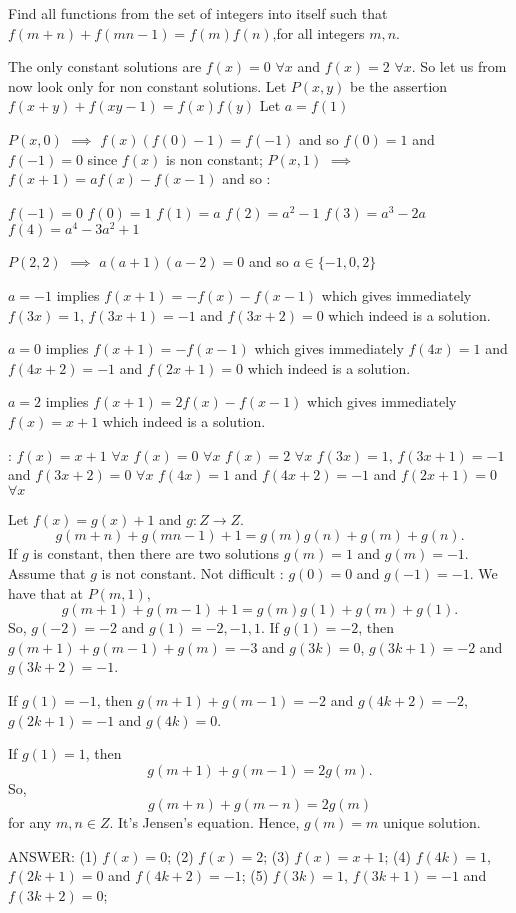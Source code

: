 \begin{solution}
	\begin{tcolorbox}Find all functions from the set of integers into itself such that $ f(m+n)+f(mn-1)=f(m)f(n) $,for all integers $m,n$.\end{tcolorbox}
The only constant solutions are $f(x)=0$ $\forall x$ and $f(x)=2$ $\forall x$.
So let us from now look only for non constant solutions.
Let $P(x,y)$ be the assertion $f(x+y)+f(xy-1)=f(x)f(y)$
Let $a=f(1)$

$P(x,0)$ $\implies$ $f(x)(f(0)-1)=f(-1)$ and so $f(0)=1$ and $f(-1)=0$ since $f(x)$ is non constant;
$P(x,1)$ $\implies$ $f(x+1)=af(x)-f(x-1)$ and so :

$f(-1)=0$
$f(0)=1$
$f(1)=a$
$f(2)=a^2-1$
$f(3)=a^3-2a$
$f(4)=a^4-3a^2+1$

$P(2,2)$ $\implies$ $a(a+1)(a-2)=0$ and so $a\in\{-1,0,2\}$

$a=-1$ implies $f(x+1)=-f(x)-f(x-1)$ which gives immediately $f(3x)=1$, $f(3x+1)=-1$ and $f(3x+2)=0$ which indeed is a solution.

$a=0$ implies $f(x+1)=-f(x-1)$ which gives immediately $f(4x)=1$ and $f(4x+2)=-1$ and $f(2x+1)=0$ which indeed is a solution.

$a=2$ implies $f(x+1)=2f(x)-f(x-1)$ which gives immediately $f(x)=x+1$ which indeed is a solution.

 :
$f(x)=x+1$ $\forall x$
$f(x)=0$ $\forall x$
$f(x)=2$ $\forall x$
$f(3x)=1$, $f(3x+1)=-1$ and $f(3x+2)=0$ $\forall x$
$f(4x)=1$ and $f(4x+2)=-1$ and $f(2x+1)=0$ $\forall x$
\end{solution}



\begin{solution}
	Let  $ f(x)=g(x)+1 $ and  $g:Z \rightarrow Z$.
 \[ g(m+n)+g(mn-1)+1=g(m)g(n)+g(m)+g(n) .\]
If $g$ is constant, then there are two solutions $g(m)=1 $ and $g(m)=-1 $. Assume that  $g$ is not constant. 
Not difficult : $g(0)=0$ and  $g(-1)=-1$.
We have  that at $P(m,1)$, \[ g(m+1)+g(m-1)+1=g(m)g(1)+g(m)+g(1) .\]  
So, $g(-2)=-2$ and  $g(1)=-2,-1,1$.
If $g(1)=-2$, then  $g(m+1)+g(m-1)+g(m)=-3$ and  $g(3k)=0$,  $g(3k+1)=-2$ and  $g(3k+2)=-1 $.

If $g(1)=-1$, then  $g(m+1)+g(m-1)=-2$ and  $g(4k+2)=-2$,  $g(2k+1)=-1$ and $g(4k)=0$.

If $g(1)=1$, then \[ g(m+1)+g(m-1) =2g(m) .\] 
So,   \[ g(m+n)+g(m-n)=2g(m) \] for any  $m,n \in Z$.
It's Jensen's equation.
Hence, $g(m)=m$ unique solution.
 
ANSWER:  
(1) $f(x)=0$;
(2) $f(x)=2$;
(3) $f(x)=x+1$;
(4) $f(4k)=1$, $f(2k+1)=0$ and  $f(4k+2)=-1$;
(5) $f(3k)=1$, $f(3k+1)=-1$ and $f(3k+2)=0$;
  
\end{solution}



